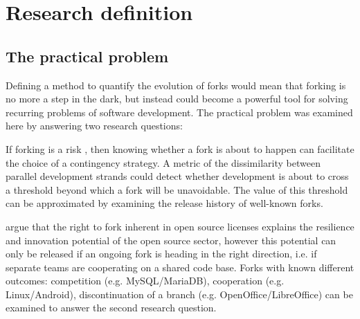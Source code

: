 
\chapter{Research definition} %

\label{Chapter2} %

\section{The practical problem}

Defining a method to quantify the evolution of forks would mean that forking is no more a step in the dark, but instead could become a powerful tool for solving recurring problems of software development. The practical problem was examined here by answering two research questions:


\noindent
If forking is a risk \citep{Kogut2001a}, then knowing whether a fork is about to happen can facilitate the choice of a contingency strategy. A metric of the dissimilarity between parallel development strands could detect whether development is about to cross a threshold beyond which a fork will be unavoidable. The value of this threshold can be approximated by examining the release history of well-known forks.


\noindent
\citet{Nyman2013a} argue that the right to fork inherent in open source licenses explains the resilience and innovation potential of the open source sector, however this potential can only be released if an ongoing fork is heading in the right direction, i.e. if separate teams are cooperating on a shared code base. Forks with known different outcomes: competition (e.g. MySQL/MariaDB), cooperation (e.g. Linux/Android), discontinuation of a branch (e.g. OpenOffice/LibreOffice) can be examined to answer the second research question.


